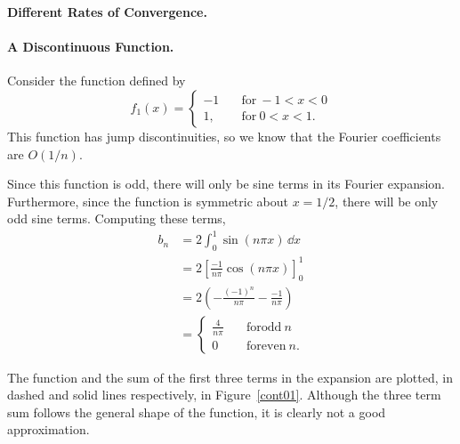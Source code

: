 \begin{Example}\textbf{Different Rates of Convergence.}

  \paragraph{A Discontinuous Function.}
  Consider the function defined by
  \[ f_1(x) = 
  \begin{cases}
    -1 \quad &\mathrm{for}\ -1 < x < 0 \\
    1, \quad &\mathrm{for}\ 0 < x < 1.
  \end{cases}
  \]
  This function has jump discontinuities, so we know that the Fourier
  coefficients are $O(1/n)$. 

  Since this function is odd, there will only be sine terms in its Fourier
  expansion.  Furthermore, since the function is symmetric about
  $x = 1/2$, there will be only odd sine terms.
  Computing these terms,
  \begin{align*}
    b_n     &= 2 \int_0^1 \sin(n \pi x)\,\dd x \\
    &= 2\left[ \frac{-1}{n\pi} \cos(n \pi x) \right]_0^1 \\
    &= 2 \left( - \frac{(-1)^n}{n \pi} - \frac{-1}{n \pi} \right) \\
    &=      \begin{cases}
      \frac{4}{n\pi} \quad &\mathrm{for odd}\ n \\
      0 \quad &\mathrm{for even}\ n.
    \end{cases}
  \end{align*}

  The function and the sum of the first three terms in the expansion
  are plotted, in dashed and solid lines respectively,
  in Figure~\ref{cont01}.  Although the three term sum
  follows the general shape of the function, it is clearly not a good
  approximation.



\end{Example}
